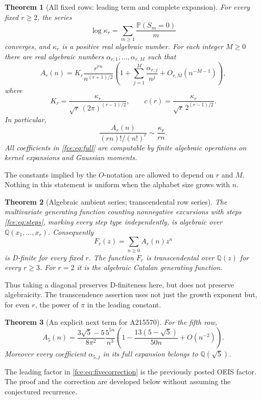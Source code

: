 \documentclass[11pt,a4paper]{article}
\numberwithin{equation}{section}
\newtheorem{theorem}{Theorem}[section]
\theoremstyle{definition}\newtheorem{definition}[theorem]{Definition}
\theoremstyle{remark}\newtheorem{remark}[theorem]{Remark}
\newcommand{\Q}{\mathbb Q}
\newcommand{\Prob}{\mathbb P}
\begin{document}
\begin{theorem}[All fixed rows: leading term and complete expansion]\label{fce:thm:main}
For every fixed $r\ge2$, the series
\begin{equation}\label{fce:eq:kappaseries}
 \log\kappa_r=\sum_{m\ge1}\frac{\Prob(S_m=0)}m
\end{equation}
converges, and $\kappa_r$ is a positive real algebraic number. For each
integer $M\ge0$ there are real algebraic numbers $\alpha_{r,1},\ldots,
\alpha_{r,M}$ such that
\begin{equation}\label{fce:eq:full}
 A_r(n)=K_r\frac{r^{rn}}{n^{(r+1)/2}}
 \left(1+\sum_{j=1}^M\frac{\alpha_{r,j}}{n^j}
       +O_{r,M}(n^{-M-1})\right),
\end{equation}
where
\begin{equation}\label{fce:eq:constant}
 K_r=\frac{\kappa_r}{\sqrt r\,(2\pi)^{(r-1)/2}},\qquad
 c(r)=\frac{\kappa_r}{\sqrt r\,2^{(r-1)/2}}.
\end{equation}
In particular,
\begin{equation}\label{fce:eq:probability}
 \frac{A_r(n)}{(rn)!/(n!)^r}\sim\frac{\kappa_r}{rn}.
\end{equation}
All coefficients in \eqref{fce:eq:full} are computable by finite algebraic
operations on kernel expansions and Gaussian moments.
\end{theorem}
The constants implied by the $O$-notation are allowed to depend on $r$
and $M$. Nothing in this statement is uniform when the alphabet size
grows with $n$.

\begin{theorem}[Algebraic ambient series; transcendental row series]\label{fce:thm:class}
The multivariate generating function counting nonnegative excursions
with steps \eqref{fce:eq:steps}, marking every step type independently, is
algebraic over $\Q(x_1,\ldots,x_r)$. Consequently
\[
 F_r(z)=\sum_{n\ge0}A_r(n)z^n
\]
is D-finite for every fixed $r$. The function $F_r$ is transcendental over
$\Q(z)$ for every $r\ge3$. For $r=2$ it is the algebraic Catalan generating
function.
\end{theorem}
Thus taking a diagonal preserves D-finiteness here, but does not preserve
algebraicity. The transcendence assertion uses not just the growth
exponent but, for even $r$, the power of $\pi$ in the leading constant.

\begin{theorem}[An explicit next term for A215570]\label{fce:thm:five}
For the fifth row,
\begin{equation}\label{fce:eq:fivecorrection}
 A_5(n)=\frac{3\sqrt5-5}{8\pi^2}\frac{5^{5n}}{n^3}
 \left(1-\frac{13(5-\sqrt5)}{50n}+O(n^{-2})\right).
\end{equation}
Moreover every coefficient $\alpha_{5,j}$ in its full expansion belongs
to $\Q(\sqrt5)$.
\end{theorem}
The leading factor in \eqref{fce:eq:fivecorrection} is the previously posted
OEIS factor. The proof and the correction are developed below without
assuming the conjectured recurrence.
\end{document}
